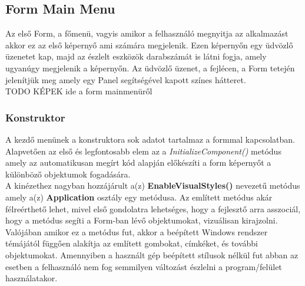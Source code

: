 \documentclass[tocnopagenum]{thesis-ekf}
\theoremstyle{definition}
\theoremstyle{remark}
\begin{document}

	\subsection{Form Main Menu}
	\label{FormMainmenu}
	Az első Form, a főmenü, vagyis amikor a felhasználó megnyitja az alkalmazást akkor ez az első képernyő ami számára megjelenik. 
	Ezen képernyőn egy üdvözlő üzenetet kap, majd az észlelt eszközök darabszámát is látni fogja, amely ugyanúgy megjelenik a képernyőn.
	Az üdvözlő üzenet, a fejlécen, a Form tetején jelenítjük meg amely egy Panel segítségével kapott színes hátteret.
	\\TODO KÉPEK ide a form mainmenüről
	\subsubsection{Konstruktor}
	A kezdő menünek a konstruktora sok adatot tartalmaz a formmal kapcsolatban. Alapvetően az első és legfontosabb elem az a \textit{InitializeComponent()} metódus amely az automatikusan megírt kód alapján előkészíti a form képernyőt a különböző objektumok fogadására.
	\\
	 A kinézethez nagyban hozzájárult a(z) \textbf{EnableVisualStyles()} nevezetű metódus amely a(z) \textbf{Application} osztály egy metódusa. Az említett metódus akár félreérthető lehet, mivel első gondolatra lehetséges, hogy a fejlesztő arra asszociál, hogy a metódus segíti a Form-ban lévő objektumokat, vizuálisan kirajzolni. Valójában amikor ez a metódus fut, akkor a beépített Windows rendszer témájától függően alakítja az említett gombokat, címkéket, és további objektumokat. Amennyiben a használt gép beépített stílusok nélkül fut abban az esetben a felhasználó nem fog semmilyen változást észlelni a program/felület használatakor.
\end{document}
